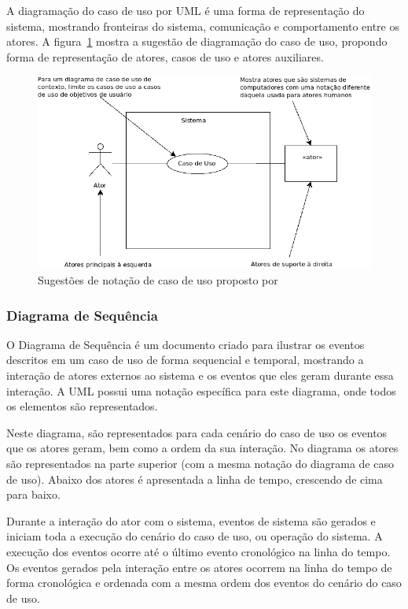 A diagramação do caso de uso por UML é uma forma de representação do sistema, mostrando fronteiras do sistema, comunicação e comportamento entre os atores. A figura~\ref{fig:diagrama-uml} mostra a sugestão de diagramação do caso de uso, propondo forma de representação de atores, casos de uso e atores auxiliares.

\begin{figure}
	\centering
	\includegraphics[scale=0.75]{images/exemplo-uml.png}
	\caption{Sugestões de notação de caso de uso proposto por ~\cite{larman08}}
	\label{fig:diagrama-uml}
\end{figure}

\subsubsection{Diagrama de Sequência}
O Diagrama de Sequência é um documento criado para ilustrar os eventos descritos em um caso de uso de forma sequencial e temporal, mostrando a interação de atores externos ao sistema e os eventos que eles geram durante essa interação. A UML possui uma notação específica para este diagrama, onde todos os elementos são representados.

Neste diagrama, são representados para cada cenário do caso de uso os eventos que os atores geram, bem como a ordem da sua interação. No diagrama os atores são representados na parte superior (com a mesma notação do diagrama de caso de uso). Abaixo dos atores é apresentada a linha de tempo, crescendo de cima para baixo. 

Durante a interação do ator com o sistema, eventos de sistema são gerados e iniciam toda a execução do cenário do caso de uso, ou operação do sistema. A execução dos eventos ocorre até o último evento cronológico na linha do tempo. Os eventos gerados pela interação entre os atores ocorrem na linha do tempo de forma cronológica e ordenada com a mesma ordem dos eventos do cenário do caso de uso.

